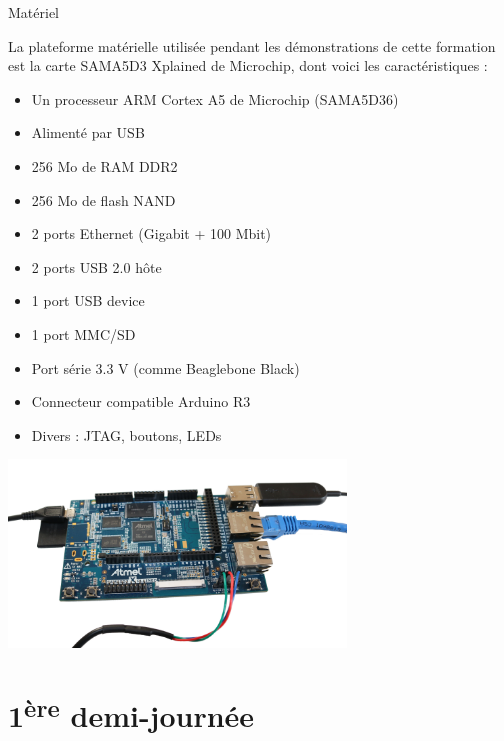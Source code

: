 \documentclass[a4paper,12pt,obeyspaces,spaces,hyphens]{article}
\begin{document}
\feagendatwocolumn
{Matériel}
{
  La plateforme matérielle utilisée pendant les démonstrations de
  cette formation est la carte {SAMA5D3 Xplained de Microchip}, dont voici les
  caractéristiques :

  \begin{itemize}
  \item Un processeur ARM Cortex A5 de Microchip (SAMA5D36)
  \item Alimenté par USB
  \item 256 Mo de RAM DDR2
  \item 256 Mo de flash NAND
  \item 2 ports Ethernet (Gigabit + 100 Mbit)
  \item 2 ports USB 2.0 hôte
  \item 1 port USB device
  \item 1 port MMC/SD
  \item Port série 3.3 V (comme Beaglebone Black)
  \item Connecteur compatible Arduino R3
  \item Divers : JTAG, boutons, LEDs
  \end{itemize}
}
{}
{
  \begin{center}
    \includegraphics[height=5cm]{../slides/xplained-board/xplained-board.png}
  \end{center}
}

\section{1\textsuperscript{ère} demi-journée}
\end{document}
